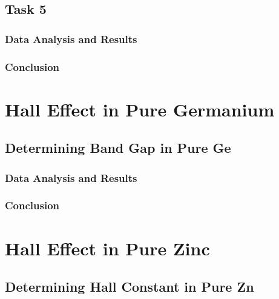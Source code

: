 \documentclass[a4paper]{article}
\begin{document}
\subsection{Task 5}

\subsubsection{Data Analysis and Results}

\subsubsection{Conclusion}

\newpage

\section{Hall Effect in Pure Germanium}

\subsection{Determining Band Gap in Pure Ge}

\subsubsection{Data Analysis and Results}

\subsubsection{Conclusion}

\section{Hall Effect in Pure Zinc}

\subsection{Determining Hall Constant in Pure Zn}
\end{document}
